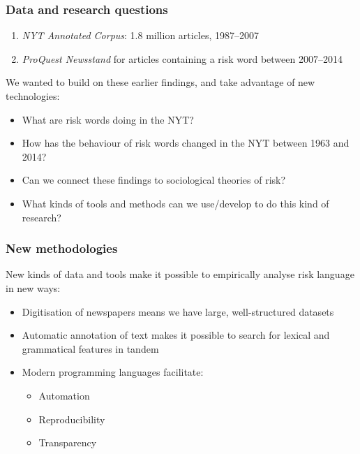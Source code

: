 \documentclass{beamer}       %
\begin{document}
\begin{frame}
    \frametitle{Data and research questions}

    \begin{enumerate}
        \item \emph{NYT Annotated Corpus}: 1.8 million articles, 1987--2007 \cite{sandhaus_new_2008}
        \item \emph{ProQuest Newsstand} for articles containing a risk word between 2007--2014
    \end{enumerate}

    We wanted to build on these earlier findings, and take advantage of new technologies:

    \begin{itemize}
        \item What are risk words doing in the NYT?
        \item How has the behaviour of risk words changed in the NYT between 1963 and 2014?
        \item Can we connect these findings to sociological theories of risk?
        \item What kinds of tools and methods can we use\slash develop to do this kind of research?
    \end{itemize}
\end{frame}

\begin{frame}
    \frametitle{New methodologies}

    New kinds of data and tools make it possible to empirically analyse risk language in new ways:
    
    \begin{itemize}
    \item Digitisation of newspapers means we have large, well-structured datasets
    \item Automatic annotation of text makes it possible to search for lexical and grammatical features in tandem
    \item Modern programming languages facilitate:
    \begin{itemize}
        \item Automation
        \item Reproducibility
        \item Transparency
    \end{itemize}
    \end{itemize}

\end{frame}
\end{document}
